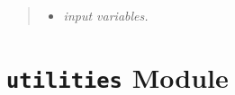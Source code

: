 \documentclass[letterpaper,10pt,english]{sphinxmanual}
\begin{document}
\begin{fulllineitems}
\begin{fulllineitems}
\begin{quote}
\begin{description}
\begin{itemize}
\item {} 
\emph{input variables.}

\end{itemize}


\end{description}\end{quote}

\end{fulllineitems}


\end{fulllineitems}



\section{\texttt{utilities} Module}
\label{pytrajectory:module-pytrajectory.utilities}\label{pytrajectory:utilities-module}
\end{document}
